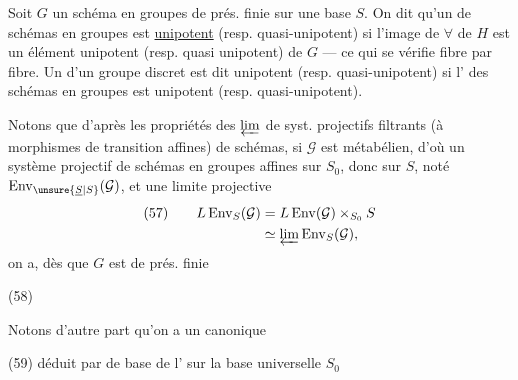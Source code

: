 Soit $G$ un schéma en groupes  de prés. finie sur une base $S$.
On dit qu'un  de schémas en groupes
est  \uline{unipotent} (resp. quasi-unipotent) si l'image de $\forall$  de $H$ est un élément unipotent (resp. quasi unipotent) de $G$ --- ce qui se vérifie fibre par fibre. Un  d'un groupe discret
est dit unipotent (resp. quasi-unipotent) si l' des schémas en groupes  
est unipotent (resp. quasi-unipotent).



Notons que d'après les propriétés des $\varprojlim$ de syst. projectifs filtrants (à morphismes de transition affines)  de schémas, si $\mathcal{G}$ est métabélien, d'où un système projectif de schémas en groupes affines sur $S_0$, donc sur $S$, noté $\operatorname{Env}_{\unsure{\underline{S}|S}}(\mathcal{G})$, et une limite projective
\[
\begin{aligned}
(57)\qquad L\operatorname{Env}_S(\mathcal{G})
 &=L\operatorname{Env}(\mathcal{G})\times_{S_0}S\\
 &\simeq\varprojlim\operatorname{Env}_S(\mathcal{G}),
\end{aligned}
\]
on a, dès que $G$ est  de prés. finie

(58)\quad
{}

Notons d'autre part qu'on a un   canonique

(59)\quad
{}
déduit par  de base de l' sur la base universelle $S_0$

